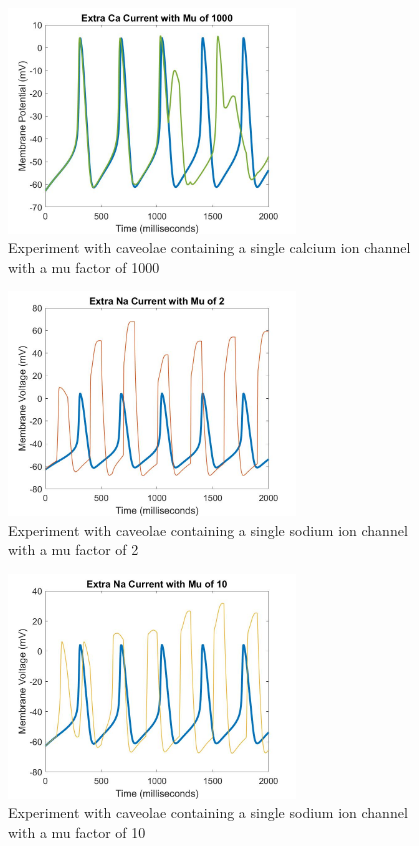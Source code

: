 \documentclass{bmcart}%
\begin{document}
\begin{figure}[ht]
  \centering
  \includegraphics[width=3in]{images/CaMu1000}
  \caption[CacliumMu1000]
  {Experiment with caveolae containing a single calcium ion channel\\
  with a mu factor of 1000}
\label{fig:CaMu1000}
\end{figure}
 

\begin{figure}[ht]
  \centering
  \includegraphics[width=3in]{images/NaMu2}
  \caption[SodiumMu2]
  {Experiment with caveolae containing a single sodium ion channel\\
  with a mu factor of 2}
\label{fig:NaMu2}
\end{figure}

\begin{figure}[ht]
  \centering
  \includegraphics[width=3in]{images/NaMu10}
  \caption[SodiumMu10]
  {Experiment with caveolae containing a single sodium ion channel\\
  with a mu factor of 10}
\label{fig:NaMu10}
\end{figure}
\end{document}
